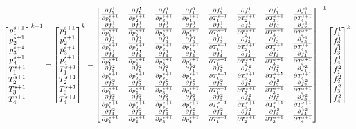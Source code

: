\documentclass[preprint,12pt]{elsarticle}
\numberwithin{equation}{section}
\begin{document}
\begin{equation}
	\begin{bmatrix}
		p_1^{s+1}\\
		p_2^{s+1}\\
		p_3^{s+1}\\
		p_4^{s+1}\\
		T_1^{s+1}\\
		T_2^{s+1}\\
		T_3^{s+1}\\
		T_4^{s+1}
	\end{bmatrix}^{k+1}
	=
	\begin{bmatrix}
		p_1^{s+1}\\
		p_2^{s+1}\\
		p_3^{s+1}\\
		p_4^{s+1}\\
		T_1^{s+1}\\
		T_2^{s+1}\\
		T_3^{s+1}\\
		T_4^{s+1}
	\end{bmatrix}^{k}-
	\begin{bmatrix}
		\JPP{1}{1} & \JPP{1}{2} & \JPP{1}{3} & \JPP{1}{4} & \JPT{1}{1} & \JPT{1}{2}&\JPT{1}{3}&\JPT{1}{4}\\
		
		\JPP{2}{1} & \JPP{2}{2} & \JPP{2}{3} & \JPP{2}{4} & \JPT{2}{1} & \JPT{2}{2}&\JPT{2}{3}&\JPT{2}{4}\\
		
		\JPP{3}{1} & \JPP{3}{2} & \JPP{3}{3} & \JPP{3}{4} & \JPT{3}{1} & \JPT{3}{2}&\JPT{3}{3}&\JPT{3}{4}\\
		
		\JPP{4}{1} & \JPP{4}{2} & \JPP{4}{3} & \JPP{4}{4} & \JPT{4}{1} & \JPT{4}{2}&\JPT{4}{3}&\JPT{4}{4}\\
		\JTP{1}{1} & \JTP{1}{2} & \JTP{1}{3} & \JTP{1}{4} & \JTT{1}{1} & \JTT{1}{2}&\JTT{1}{3}&\JTT{1}{4}\\
		
		\JTP{2}{1} & \JTP{2}{2} & \JTP{2}{3} & \JTP{2}{4} & \JTT{2}{1} & \JTT{2}{2}&\JTT{2}{3}&\JTT{2}{4}\\
		
		\JTP{3}{1} & \JTP{3}{2} & \JTP{3}{3} & \JTP{3}{4} & \JTT{3}{1} & \JTT{3}{2}&\JTT{3}{3}&\JTT{3}{4}\\
		
		\JTP{4}{1} & \JTP{4}{2} & \JTP{4}{3} & \JTP{4}{4} & \JTT{4}{1} & \JTT{4}{2}&\JTT{4}{3}&\JTT{4}{4}
	\end{bmatrix}^{-1}
	\begin{bmatrix}
		f_1^{1}\\
		f_2^{1}\\
		f_3^{1}\\
		f_4^{1}\\
		f_1^{2}\\
		f_2^{2}\\
		f_3^{2}\\
		f_4^{2}
	\end{bmatrix}^{k}
\end{equation}
\end{document}
